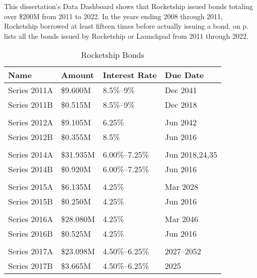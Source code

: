 This dissertation's Data Dashboard shows that Rocketship issued bonds totaling over \$200M from 2011 to 2022. In the years ending 2008 through 2011, Rocketship borrowed at least fifteen times before actually issuing a bond.  on p.\pageref{tab:rocketship_bonds} lists all the bonds issued by Rocketship or Launchpad from 2011 through 2022.

\begin{table}[ht]
  \SingleSpacing
  \caption{Rocketship Bonds}\label{tab:rocketship_bonds}%
  \begin{tabular}{llll}
    \toprule
    Name             & Amount    & Interest Rate  & Due Date       \\
    \midrule
    Series 2011A     & \$9.600M  & 8.5\%–9\%      & Dec 2041       \\
    Series 2011B     & \$0.515M  & 8.5\%–9\%      & Dec 2018       \\
                                                                   \\
    Series 2012A     & \$9.105M  & 6.25\%         & Jun 2042       \\
    Series 2012B     & \$0.355M  & 8.5\%          & Jun 2016       \\
                                                                   \\
    Series 2014A     & \$31.935M & 6.00\%–7.25\%  & Jun 2018,24,35 \\
    Series 2014B     & \$0.920M  & 6.00\%–7.25\%  & Jun 2016       \\
                                                                   \\
    Series 2015A     & \$6.135M  & 4.25\%         & Mar 2028       \\
    Series 2015B     & \$0.250M  & 4.25\%         & Jun 2016       \\
                                                                   \\
    Series 2016A     & \$28.080M & 4.25\%         & Mar 2046       \\
    Series 2016B     & \$0.525M  & 4.25\%         & Jun 2016       \\
                                                                   \\
    Series 2017A     & \$23.098M & 4.50\%–6.25\%  & 2027–2052      \\
    Series 2017B     & \$3.665M  & 4.50\%–6.25\%  & 2025           \\

\end{tabular}
\end{table}

